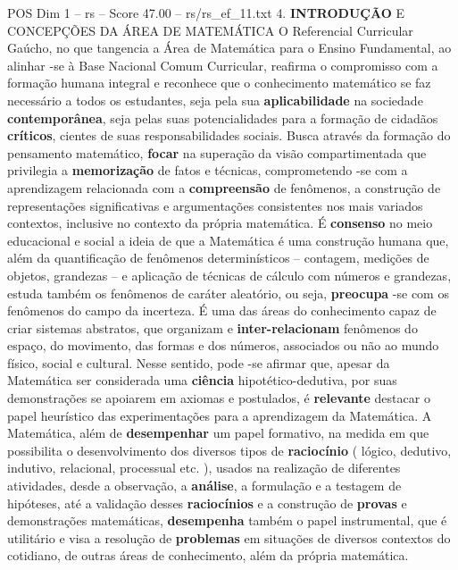 \begin{textsample}{POS Dim 1 – rs – Score 47.00 – rs/rs\_ef\_11.txt}  \label{ex:f1_pos_206}
4. \textbf{INTRODUÇÃO} E CONCEPÇÕES DA ÁREA DE MATEMÁTICA O Referencial Curricular Gaúcho, no que tangencia a Área de Matemática para o Ensino Fundamental, ao alinhar -se à Base Nacional Comum Curricular, reafirma o compromisso com a formação humana integral e reconhece que o conhecimento matemático se faz necessário a todos os estudantes, seja pela sua \textbf{aplicabilidade} na sociedade \textbf{contemporânea}, seja pelas suas potencialidades para a formação de cidadãos \textbf{críticos}, cientes de suas responsabilidades sociais.
Busca através da formação do pensamento matemático, \textbf{focar} na superação da visão compartimentada que privilegia a \textbf{memorização} de fatos e técnicas, comprometendo -se com a aprendizagem relacionada com a \textbf{compreensão} de fenômenos, a construção de representações significativas e argumentações consistentes nos mais variados contextos, inclusive no contexto da própria matemática.
É \textbf{consenso} no meio educacional e social a ideia de que a Matemática é uma construção humana que, além da quantificação de fenômenos determinísticos – contagem, medições de objetos, grandezas – e aplicação de técnicas de cálculo com números e grandezas, estuda também os fenômenos de caráter aleatório, ou seja, \textbf{preocupa} -se com os fenômenos do campo da incerteza.
É uma das áreas do conhecimento capaz de criar sistemas abstratos, que organizam e \textbf{inter-relacionam} fenômenos do espaço, do movimento, das formas e dos números, associados ou não ao mundo físico, social e cultural.
Nesse sentido, pode -se afirmar que, apesar da Matemática ser considerada uma \textbf{ciência} hipotético-dedutiva, por suas demonstrações se apoiarem em axiomas e postulados, é \textbf{relevante} destacar o papel heurístico das experimentações para a aprendizagem da Matemática.
A Matemática, além de \textbf{desempenhar} um papel formativo, na medida em que possibilita o desenvolvimento dos diversos tipos de \textbf{raciocínio} ( lógico, dedutivo, indutivo, relacional, processual etc. ), usados na realização de diferentes atividades, desde a observação, a \textbf{análise}, a formulação e a testagem de hipóteses, até a validação desses \textbf{raciocínios} e a construção de \textbf{provas} e demonstrações matemáticas, \textbf{desempenha} também o papel instrumental, que é utilitário e visa a resolução de \textbf{problemas} em situações de diversos contextos do cotidiano, de outras áreas de conhecimento, além da própria matemática.

\end{textsample}
